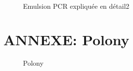 \documentclass[a4paper]{article}
\begin{document}
\begin{figure}[!h]
\caption{Emulsion PCR expliquée en détail2}
\end{figure}

\section*{ANNEXE: Polony}

\begin{figure}[!h]
\caption{Polony}
\end{figure}
\end{document}
